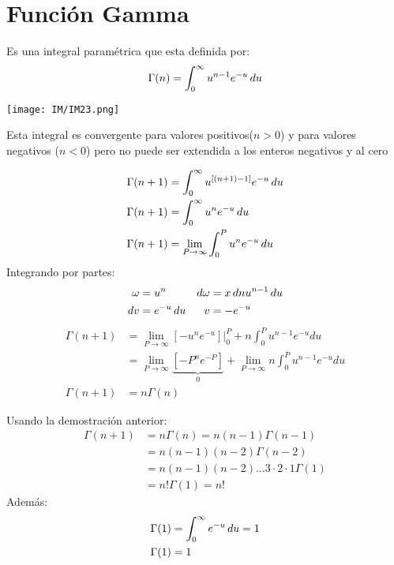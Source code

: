 \documentclass[
	12pt, %
	fleqn, %
	a4paper, %
]{LegrandOrangeBook}
\begin{document}
\section{Función Gamma}
\begin{definition}
Es una integral paramétrica que esta definida por:
\begin{equation}
\Gamma (n)=\int_0^{\infty}u^{n-1}e^{-u}\mathop{}\!d u
\label{eq:Fgamma}
\end{equation}
\begin{center}
\texttt{[image: IM/IM23.png]}
\end{center}
Esta integral es convergente para valores positivos($n>0$) y para valores negativos ($n<0$) pero no puede ser extendida a los enteros negativos y al cero
\end{definition}
\begin{theorem}[Demostrar $\Gamma(n+1)=n\Gamma(n)\forall n>0$]
\begin{align*}
\Gamma(n+1)&=\int_0^{\infty}u^{\left[(n+1)-1\right]}e^{-u}\mathop{}\!d u\\
\Gamma(n+1)&=\int_0^{\infty}u^ne^{-u}\mathop{}\!d u\\
\Gamma(n+1)&=\lim_{P\to\infty}\int_0^Pu^ne^{-u}\mathop{}\!d u
\end{align*}
Integrando por partes:
\begin{displaymath}
\begin{alignedat}{2}
  \omega&=u^n \quad & \mathop{}\!d \omega &= x\mathop{}\!d nu^{n-1}\mathop{}\!d u\\
  \mathop{}\!d v &= e^{-u}\mathop{}\!d u \quad & v &= -e^{-u}
\end{alignedat}
\end{displaymath}
\begin{align*}
\Gamma (n+1)&=\lim_{P\to \infty}\left[-u^ne^{-u}\right]\Big|_0^P+n\int_0^Pu^{n-1}e^{-u}du\\
&=\lim_{P\to\infty}\underbrace{\left[-P^ne^{-P}\right]}_{0}+\lim_{P\to\infty}n\int_0^Pu^{n-1}e^{-u}du\\
\Gamma (n+1)&=n\Gamma(n)
\end{align*}
\end{theorem}
\begin{theorem}[Demostrar $\Gamma(n+1)=n!\forall n\in\mathcal{Z}^+$]
Usando la demostración anterior:
\begin{align*}
\Gamma(n+1)&=n\Gamma(n)=n(n-1)\Gamma(n-1)\\
&=n(n-1)(n-2)\Gamma(n-2)\\
&=n(n-1)(n-2)\ldots 3\cdot 2\cdot 1\Gamma(1)\\
&=n!\Gamma(1)=n!
\end{align*}
Además:
\begin{align*}
\Gamma(1)&=\int_0^{\infty}e^{-u}\mathop{}\!d u=1\\
\Gamma(1)&=1
\end{align*}
\end{theorem}
\end{document}
